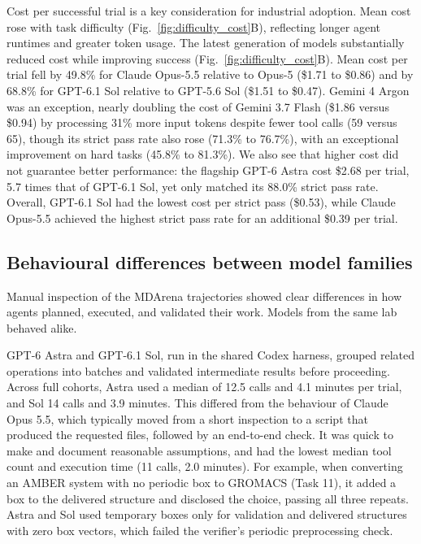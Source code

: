 Cost per successful trial is a key consideration for industrial adoption. Mean cost rose with task difficulty (Fig.~\ref{fig:difficulty_cost}B), reflecting longer agent runtimes and greater token usage. The latest generation of models substantially reduced cost while improving success (Fig.~\ref{fig:difficulty_cost}B). Mean cost per trial fell by 49.8\% for Claude Opus-5.5 relative to Opus-5 (\$1.71 to \$0.86) and by 68.8\% for GPT-6.1 Sol relative to GPT-5.6 Sol (\$1.51 to \$0.47). Gemini 4 Argon was an exception, nearly doubling the cost of Gemini 3.7 Flash (\$1.86 versus \$0.94) by processing 31\% more input tokens despite fewer tool calls (59 versus 65), though its strict pass rate also rose (71.3\% to 76.7\%), with an exceptional improvement on hard tasks (45.8\% to 81.3\%). We also see that higher cost did not guarantee better performance: the flagship GPT-6 Astra cost \$2.68 per trial, 5.7 times that of GPT-6.1 Sol, yet only matched its 88.0\% strict pass rate. Overall, GPT-6.1 Sol had the lowest cost per strict pass (\$0.53), while Claude Opus-5.5 achieved the highest strict pass rate for an additional \$0.39 per trial.



\subsection{Behavioural differences between model families}

Manual inspection of the MDArena trajectories showed clear differences in how agents planned, executed, and validated their work. Models from the same lab behaved alike. 

GPT-6 Astra and GPT-6.1 Sol, run in the shared Codex harness, grouped related operations into batches and validated intermediate results before proceeding. Across full cohorts, Astra used a median of 12.5 calls and 4.1 minutes per trial, and Sol 14 calls and 3.9 minutes. This differed from the behaviour of Claude Opus 5.5, which typically moved from a short inspection to a script that produced the requested files, followed by an end-to-end check. It was quick to make and document reasonable assumptions, and had the lowest median tool count and execution time (11 calls, 2.0 minutes). For example, when converting an AMBER system with no periodic box to GROMACS (Task 11), it added a box to the delivered structure and disclosed the choice, passing all three repeats. Astra and Sol used temporary boxes only for validation and delivered structures with zero box vectors, which failed the verifier’s periodic preprocessing check. 

